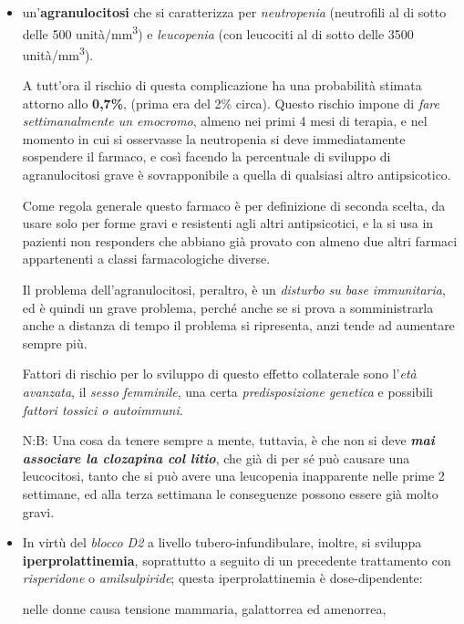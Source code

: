 \begin{itemize}
\item
  un'\textbf{agranulocitosi} che si caratterizza per \emph{neutropenia}
  (neutrofili al di sotto delle 500 unità/mm\textsuperscript{3}) e
  \emph{leucopenia} (con leucociti al di sotto delle 3500
  unità/mm\textsuperscript{3}).

  A tutt'ora il rischio di questa complicazione ha una probabilità
  stimata attorno allo \textbf{0,7\%}, (prima era del 2\% circa). Questo
  rischio impone di \emph{fare settimanalmente un emocromo}, almeno nei
  primi 4 mesi di terapia, e nel momento in cui si osservasse la
  neutropenia si deve immediatamente sospendere il farmaco, e così
  facendo la percentuale di sviluppo di agranulocitosi grave è
  sovrapponibile a quella di qualsiasi altro antipsicotico.

  Come regola generale questo farmaco è per definizione di seconda
  scelta, da usare solo per forme gravi e resistenti agli altri
  antipsicotici, e la si usa in pazienti non responders che abbiano già
  provato con almeno due altri farmaci appartenenti a classi
  farmacologiche diverse.

  Il problema dell'agranulocitosi, peraltro, è un \emph{disturbo su base
  immunitaria}, ed è quindi un grave problema, perché anche se si prova
  a somministrarla anche a distanza di tempo il problema si ripresenta,
  anzi tende ad aumentare sempre più.

  Fattori di rischio per lo sviluppo di questo effetto collaterale sono
  l'\emph{età avanzata}, il \emph{sesso} \emph{femminile}, una certa
  \emph{predisposizione genetica} e possibili \emph{fattori tossici o
  autoimmuni}.

  N:B: Una cosa da tenere sempre a mente, tuttavia, è che non si deve
  \textbf{\emph{mai associare la clozapina col litio}}, che già di per
  sé può causare una leucocitosi, tanto che si può avere una leucopenia
  inapparente nelle prime 2 settimane, ed alla terza settimana le
  conseguenze possono essere già molto gravi.
\item
  In virtù del \emph{blocco D2} a livello tubero-infundibulare, inoltre,
  si sviluppa \textbf{iperprolattinemia}, soprattutto a seguito di un
  precedente trattamento con \emph{risperidone} o \emph{amilsulpiride};
  questa iperprolattinemia è dose-dipendente:

  nelle donne causa tensione mammaria, galattorrea ed amenorrea,


\end{itemize}

